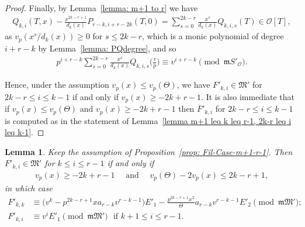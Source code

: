 \documentclass[11pt]{amsart}
\theoremstyle{definition}
\numberwithin{equation}{subsection}
\theoremstyle{plain}
\theoremstyle{plain}
\theoremstyle{plain}
\theoremstyle{plain}
\theoremstyle{plain}
\theoremstyle{plain}
\theoremstyle{plain}
\theoremstyle{plain}
\theoremstyle{plain}
\newtheorem{lemm}[equation]{Lemma}
\theoremstyle{plain}
\theoremstyle{plain}
\theoremstyle{plain}
\theoremstyle{definition}
\theoremstyle{definition}
\theoremstyle{definition}
\theoremstyle{remark}
\renewcommand{\(}{\textup{(}}
\renewcommand{\)}{\textup{)}}
\newcommand{\fM}{\mathfrak{M}}
\newcommand{\fm}{\mathfrak{m}}
\newcommand{\cO}{\mathcal{O}}
\newcommand{\barF}{\overline{F}}
\begin{document}
\begin{proof}
Finally, by Lemma~\ref{lemma: m+1 to r} we have
\begin{align*}
    Q_{k,i}(T,x)-\frac{x^{2k-r+1}}{d_k(x)}P_{r-k,i+r-2k}(T,0)=
    \sum_{s=0}^{2k-r}\frac{x^s}{d_k(x)}Q_{k,i,s}(T)
    \in\cO[T],
\end{align*}
as $v_p(x^s/d_k(x))\geq 0$ for $s\leq 2k-r$, which is a monic polynomial of degree $i+r-k$ by Lemma~\ref{lemma: PQdegree}, and so
\begin{align*}
    p^{i+r-k}\sum_{s=0}^{2k-r}\frac{x^s}{d_k(x)}Q_{k,i,s}\Big(\frac{v}{p}\Big)
    \equiv v^{i+r-k} \pmod{\fm S'_\cO}.
\end{align*}


Hence, under the assumption $v_p(x)\leq v_p(\Theta)$, we have $F'_{k,i}\in\fM'$ for $2k-r\leq i\leq k-1$ if and only if $v_p(x)\geq -2k+r-1$. It is also immediate that if $v_p(x)\leq v_p(\Theta)$ and $v_p(x)\geq -2k+r-1$ then $\barF'_{k,i}$ for $2k-r\leq i\leq k-1$ is computed as in the statement of Lemma~\ref{lemma m+1 leq k leq r-1, 2k-r leq i leq k-1}.
\end{proof}



\begin{lemm}\label{lemma m+1 leq k leq r-1, k leq i leq r-1}
Keep the assumption of Proposition~\ref{prop: Fil-Case-m+1-r-1}. Then $F'_{k,i}\in\fM'$ for $k\leq i\leq r-1$ if and only if
\begin{align*}
    v_p(x)\geq -2k+r-1 \quad\mbox{ and }\quad v_p(\Theta)-2v_p(x)\leq 2k-r+1,
\end{align*}
in which case
\begin{align*}
F'_{k,k} &\equiv \big(v^k-p^{2k-r+1}xa_{r-k}v^{r-k-1}\big)E'_1 -\frac{p^{2k-r+1}x^2}{\Theta}a_{r-k}v^{r-k-1}E'_2 \pmod{\fm\fM'};\\
F'_{k,i} &\equiv v^iE'_1\pmod{\fm\fM'}\,\,\mbox{ if }k+1\leq i\leq r-1.
\end{align*}
\end{lemm}
\end{document}
